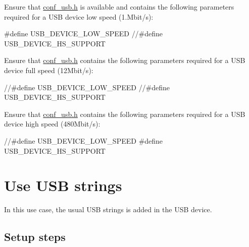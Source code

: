 \begin{DoxyEnumerate}
\item Ensure that \hyperlink{conf__usb_8h}{conf\-\_\-usb.\-h} is available and contains the following parameters required for a U\-S\-B device low speed (1.\-Mbit/s)\-:
\begin{DoxyItemize}
\item 
\begin{DoxyCode}
\textcolor{preprocessor}{ #define USB\_DEVICE\_LOW\_SPEED}
\textcolor{preprocessor}{         //#define  USB\_DEVICE\_HS\_SUPPORT }
\end{DoxyCode}

\end{DoxyItemize}
\item Ensure that \hyperlink{conf__usb_8h}{conf\-\_\-usb.\-h} contains the following parameters required for a U\-S\-B device full speed (12\-Mbit/s)\-:
\begin{DoxyItemize}
\item 
\begin{DoxyCode}
 \textcolor{comment}{//#define USB\_DEVICE\_LOW\_SPEED}
         \textcolor{comment}{//#define  USB\_DEVICE\_HS\_SUPPORT }
\end{DoxyCode}

\end{DoxyItemize}
\item Ensure that \hyperlink{conf__usb_8h}{conf\-\_\-usb.\-h} contains the following parameters required for a U\-S\-B device high speed (480\-Mbit/s)\-:
\begin{DoxyItemize}
\item 
\begin{DoxyCode}
 \textcolor{comment}{//#define USB\_DEVICE\_LOW\_SPEED}
\textcolor{preprocessor}{         #define  USB\_DEVICE\_HS\_SUPPORT }
\end{DoxyCode}
 
\end{DoxyItemize}
\end{DoxyEnumerate}\hypertarget{udc_use_case_2}{}\section{Use U\-S\-B strings}\label{udc_use_case_2}
In this use case, the usual U\-S\-B strings is added in the U\-S\-B device.\hypertarget{udc_use_case_2_udc_use_case_2_setup}{}\subsection{Setup steps}\label{udc_use_case_2_udc_use_case_2_setup}
